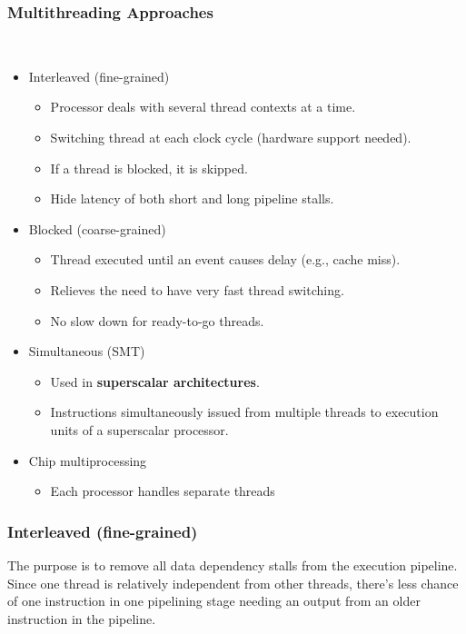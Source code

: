 \subsubsection{Multithreading Approaches}
 \\
\begin{itemize}

\item Interleaved (fine-grained)
  \begin{itemize}
  \item Processor deals with several thread contexts at a time.
  \item Switching thread at each clock cycle (hardware support needed).
  \item If a thread is blocked, it is skipped.
  \item Hide latency of both short and long pipeline stalls.
  \end{itemize}
  
\item Blocked (coarse-grained)
  \begin{itemize}
  \item Thread executed until an event causes delay (e.g., cache miss).
  \item Relieves the need to have very fast thread switching.
  \item No slow down for ready-to-go threads.
  \end{itemize}
  
\item Simultaneous (SMT)
  \begin{itemize}
  \item Used in \textbf{superscalar architectures}. 
  \item Instructions simultaneously issued from multiple threads to execution units of a superscalar processor.
  \end{itemize}

\item Chip multiprocessing
  \begin{itemize}
  \item Each processor handles separate threads
  \end{itemize}
\end{itemize}

\subsubsection{Interleaved (fine-grained)}
The purpose is to remove all data dependency stalls from the execution pipeline. Since one thread is relatively independent from other threads, there's less chance of one instruction in one pipelining stage needing an output from an older instruction in the pipeline.
